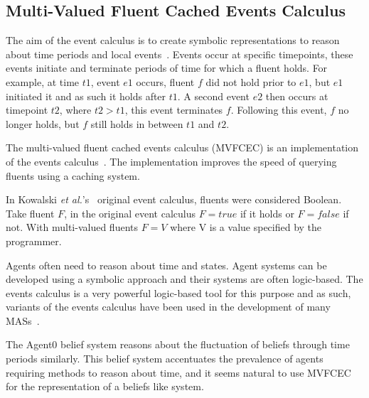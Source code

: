\documentclass[]{final_report}
\begin{document}
\subsection{Multi-Valued Fluent Cached Events Calculus}
The aim of the event calculus is to create symbolic representations to reason about time periods and local events~\cite{kowalski1989logic}. Events occur at specific timepoints, these events initiate and terminate periods of time for which a fluent holds. For example, at time $t1$, event $e1$ occurs, fluent $f$ did not hold prior to $e1$, but $e1$ initiated it and as such it holds after $t1$. A second event $e2$ then occurs at timepoint $t2$, where $t2>t1$, this event terminates $f$. Following this event, $f$ no longer holds, but $f$ still holds in between $t1$ and $t2$.\par
The multi-valued fluent cached events calculus (MVFCEC) is an implementation of the events calculus~\cite{mvfcec}. The implementation improves the speed of querying fluents using a caching system.\par 
In Kowalski \textit{et al.}'s~\cite{kowalski1989logic} original event calculus, fluents were considered Boolean. Take fluent $F$, in the original event calculus $F=true$ if it holds or $F=false$ if not. With multi-valued fluents $F=V$ where V is a value specified by the programmer.\par 
Agents often need to reason about time and states. Agent systems can be developed using a symbolic approach and their systems are often logic-based. The events calculus is a very powerful logic-based tool for this purpose and as such, variants of the events calculus have been used in the development of many MASs~\cite{artikis2009specifying, mvfcec}.\par 
The Agent0 belief system reasons about the fluctuation of beliefs through time periods similarly. This belief system accentuates the prevalence of agents requiring methods to reason about time, and it seems natural to use MVFCEC for the representation of a beliefs like system.
\end{document}
